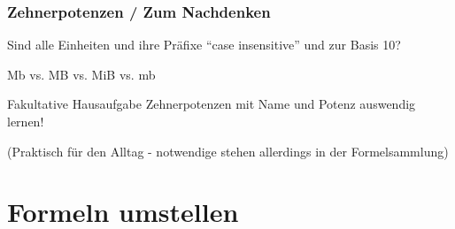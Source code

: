 \begin{frame}
    \frametitle{Zehnerpotenzen / Zum Nachdenken}

    Sind alle Einheiten und ihre Präfixe ``case insensitive'' und zur Basis 10?

    \begin{block}{\begin{center}\Large Mb vs. MB vs. MiB vs. mb\end{center}}
    \end{block}

    \vspace{2em}



\end{frame}

\begin{frame}

    \begin{alertblock}{Fakultative Hausaufgabe}
        Zehnerpotenzen mit Name und Potenz auswendig lernen!

        \bigskip \tiny (Praktisch für den Alltag - notwendige stehen allerdings
        in der Formelsammlung)
    \end{alertblock}

\end{frame}

\section{Formeln umstellen}

